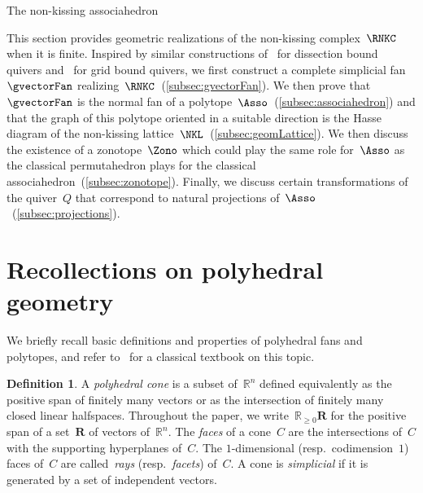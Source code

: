 \documentclass{memo-l}
\makeatletter
\theoremstyle{definition}
\newtheorem{definition}[theorem]{Definition}
\newcommand{\R}{\mathbb{R}} %
\renewcommand{\b}[1]{\mathbf{#1}} %
\newcommand{\darkblue}{\color{darkblue}} %
\newcommand{\defn}[1]{\textsl{\darkblue #1}} %
\def\part{\@startsection{part}{1}%
\z@{.7\linespacing\@plus\linespacing}{.8\linespacing}%
{\LARGE\sffamily\centering}}
\makeatother
\begin{document}

\newpage
\part{The non-kissing associahedron}
\label{part:geometry}

This section provides geometric realizations of the non-kissing complex~$\RNKC$ when it is finite.
Inspired by similar constructions of~\cite{MannevillePilaud-accordion} for dissection bound quivers and~\cite{GarverMcConville} for grid bound quivers, we first construct a complete simplicial fan~$\gvectorFan$ realizing~$\RNKC$~(\ref{subsec:gvectorFan}).
We then prove that~$\gvectorFan$ is the normal fan of a polytope~$\Asso$~(\ref{subsec:associahedron}) and that the graph of this polytope oriented in a suitable direction is the Hasse diagram of the non-kissing lattice~$\NKL$~(\ref{subsec:geomLattice}).
We then discuss the existence of a zonotope~$\Zono$ which could play the same role for~$\Asso$ as the classical permutahedron plays for the classical associahedron~(\ref{subsec:zonotope}).
Finally, we discuss certain transformations of the quiver~$Q$ that correspond to natural projections of~$\Asso$~(\ref{subsec:projections}).


\section{Recollections on polyhedral geometry}
\label{sec:polyhedralGeometry}

We briefly recall basic definitions and properties of polyhedral fans and polytopes, and refer to~\cite{Ziegler-polytopes} for a classical textbook on this topic.

\begin{definition}
A \defn{polyhedral cone} is a subset of~$\R^n$ defined equivalently as the positive span of finitely many vectors or as the intersection of finitely many closed linear halfspaces.
Throughout the paper, we write~$\R_{\ge0}\b{R}$ for the positive span of a set~$\b{R}$ of vectors of~$\R^n$.
The \defn{faces} of a cone~$C$ are the intersections of~$C$ with the supporting hyperplanes of~$C$.
The $1$-dimensional (resp.~codimension~$1$) faces of~$C$ are called~\defn{rays} (resp.~\defn{facets}) of~$C$.
A cone is \defn{simplicial} if it is generated by a set of independent vectors.
\end{definition}
\end{document}
